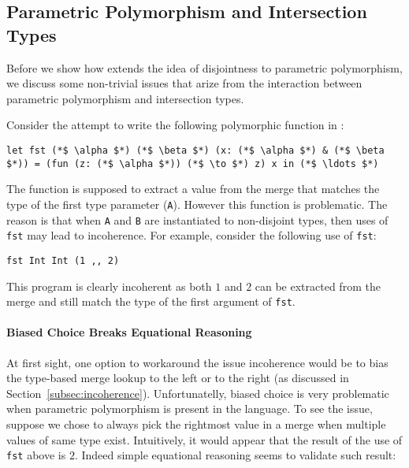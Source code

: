 \subsection{Parametric Polymorphism and Intersection Types}\label{subsec:polymorphism}
Before we show how \name extends the idea of disjointness to parametric
polymorphism, we discuss some non-trivial issues that arize from
the interaction between parametric polymorphism and intersection types.
\begin{comment}
Dunfield~\cite{} provides a
good illustrative example of the issues that arize when combining
disjoint intersection types and parametric polymorphism:
\[\lambda x. {\bf let}~y = 0 \mergeop x~{\bf in}~x\]
\end{comment}
Consider the attempt to write
the following polymorphic function in \name:
\begin{lstlisting}
let fst (*$ \alpha $*) (*$ \beta $*) (x: (*$ \alpha $*) & (*$ \beta $*)) = (fun (z: (*$ \alpha $*)) (*$ \to $*) z) x in (*$ \ldots $*)
\end{lstlisting}
The
 function is supposed to extract a value from the merge that
matches the type of the first type parameter (\lstinline{A}).  However
this function is problematic.  The reason is that when
\lstinline{A} and \lstinline{B} are instantiated to non-disjoint
types, then uses of \lstinline{fst} may lead to incoherence.
For example, consider the following use of \lstinline{fst}:
\begin{lstlisting}
fst Int Int (1 ,, 2)
\end{lstlisting}
\noindent This program is clearly incoherent as both
$1$ and $2$ can be extracted from the merge and still match the type
of the first argument of \lstinline{fst}.

\paragraph{Biased Choice Breaks Equational Reasoning} At first sight, one option
to workaround the issue incoherence would be to bias the type-based merge lookup
to the left or to the right (as discussed in
Section~\ref{subsec:incoherence}). Unfortunatelly, biased choice is
very problematic when parametric polymorphism is present in the language.
To see the issue, suppose we chose to always pick the
rightmost value in a merge when multiple values of same type exist.
Intuitively, it would appear that the result of the use of
\lstinline{fst} above is $2$. Indeed simple equational reasoning
seems to validate such result:

